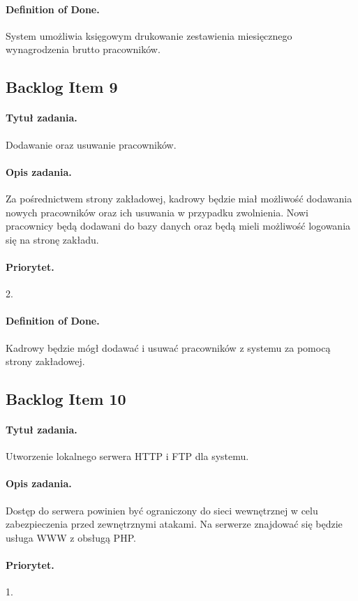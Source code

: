 \documentclass[a4paper]{article}
\begin{document}
\paragraph{Definition of Done.} System umożliwia księgowym drukowanie zestawienia miesięcznego wynagrodzenia brutto pracowników.

\subsection{Backlog Item 9}
\paragraph{Tytuł zadania.} Dodawanie oraz usuwanie pracowników.
\paragraph{Opis zadania.} Za pośrednictwem strony zakładowej, kadrowy będzie miał możliwość dodawania nowych pracowników oraz ich usuwania w przypadku zwolnienia. Nowi pracownicy będą dodawani do bazy danych oraz będą mieli możliwość logowania się na stronę zakładu.
\paragraph{Priorytet.} 2.
\paragraph{Definition of Done.} Kadrowy będzie mógł dodawać i usuwać pracowników z systemu za pomocą strony zakładowej.

\subsection{Backlog Item 10}
\paragraph{Tytuł zadania.} Utworzenie lokalnego serwera HTTP i FTP dla systemu.
\paragraph{Opis zadania.} Dostęp do serwera powinien być ograniczony do sieci wewnętrznej w celu zabezpieczenia przed zewnętrznymi atakami. Na serwerze znajdować się będzie usługa WWW z obsługą PHP.
\paragraph{Priorytet.} 1.
\end{document}
